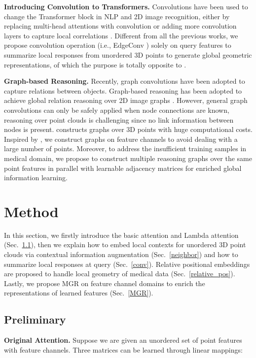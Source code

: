 \documentclass[10pt,twocolumn,letterpaper]{article}
\begin{document}
\noindent \textbf{Introducing Convolution to Transformers.}
Convolutions have been used to change the Transformer block in NLP and 2D image recognition, either by replacing multi-head attentions with convolution \cite{wu2019pay} or adding more convolution layers to capture local correlations \cite{wu2020lite, liu2020convtransformer, wu2021cvt}.
Different from all the previous works, we propose convolution operation (i.e., EdgeConv \cite{wang2019dynamic}) solely on query features to summarize local responses from unordered 3D points to generate global geometric representations, of which the purpose is totally opposite to \cite{liu2020convtransformer, wu2021cvt}.



\noindent \textbf{Graph-based Reasoning.}
Recently, graph convolutions \cite{gcn} have been adopted to capture relations between objects.
Graph-based reasoning has been adopted to achieve global relation reasoning over 2D image graphs \cite{latentgnn}.
However, general graph convolutions can only be safely applied when node connections are known, reasoning over point clouds is challenging since no link information between nodes is present.
\cite{superpoint} constructs graphs over 3D points with huge computational costs.
Inspired by \cite{ma2020global}, we construct graphs on feature channels to avoid dealing with a large number of points.
Moreover, to address the insufficient training samples in medical domain, we propose to construct multiple reasoning graphs over the same point features in parallel with learnable adjacency matrices for enriched global information learning.

\section{Method}
In this section, we firstly introduce the basic attention and Lambda attention (Sec.~\ref{sec:3.1}), then we explain how to embed local contexts for unordered 3D point clouds via contextual information augmentation (Sec.~\ref{neighbor}) and how to summarize local responses at query (Sec.~\ref{conv}).
Relative positional embeddings are proposed to handle local geometry of medical data (Sec.~\ref{relative_pos}).
Lastly, we propose MGR on feature channel domains to enrich the representations of learned features (Sec.~\ref{MGR}).

\subsection{Preliminary} \label{sec:3.1}
\noindent \textbf{Original Attention.}
Suppose we are given an unordered set of  point features  with  feature channels. Three matrices can be learned through linear mappings:
\end{document}

